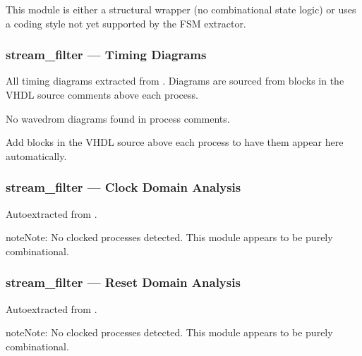 \documentclass[letterpaper,10pt,english]{sphinxmanual}
\begin{document}
\sphinxAtStartPar
This module is either a structural wrapper (no combinational
state logic) or uses a coding style not yet supported by the
FSM extractor.

\sphinxstepscope


\subsubsection{stream\_filter — Timing Diagrams}
\label{\detokenize{modules/stream_filter/timing:stream-filter-timing-diagrams}}\label{\detokenize{modules/stream_filter/timing::doc}}
\sphinxAtStartPar
All timing diagrams extracted from .
Diagrams are sourced from  blocks in the VHDL
source comments above each process.

\sphinxAtStartPar
No wavedrom diagrams found in process comments.

\sphinxAtStartPar
Add  blocks in the VHDL source above each
process to have them appear here automatically.

\sphinxstepscope


\subsubsection{stream\_filter — Clock Domain Analysis}
\label{\detokenize{modules/stream_filter/cdc:stream-filter-clock-domain-analysis}}\label{\detokenize{modules/stream_filter/cdc::doc}}
\sphinxAtStartPar
Auto\sphinxhyphen{}extracted from .

\begin{sphinxadmonition}{note}{Note:}
\sphinxAtStartPar
No clocked processes detected. This module appears to be purely combinational.
\end{sphinxadmonition}

\sphinxstepscope


\subsubsection{stream\_filter — Reset Domain Analysis}
\label{\detokenize{modules/stream_filter/reset:stream-filter-reset-domain-analysis}}\label{\detokenize{modules/stream_filter/reset::doc}}
\sphinxAtStartPar
Auto\sphinxhyphen{}extracted from .

\begin{sphinxadmonition}{note}{Note:}
\sphinxAtStartPar
No clocked processes detected. This module appears to be purely combinational.
\end{sphinxadmonition}
\end{document}
